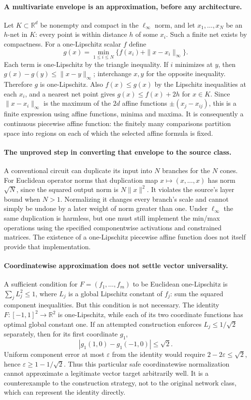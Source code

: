 \documentclass[11pt]{article}
\begin{document}
\paragraph{A multivariate envelope is an approximation, before any architecture.}
Let $K\subset\mathbb R^d$ be nonempty and compact in the $\ell_\infty$ norm, and let
$x_1,\ldots,x_N$ be an $h$-net in $K$: every point is within distance $h$ of
some $x_i$. Such a finite net exists by compactness.
For a one-Lipschitz scalar $f$ define
\[
 g(x)=\min_{1\leq i\leq N}\{f(x_i)+\|x-x_i\|_\infty\}.
\]
Each term is one-Lipschitz by the triangle inequality. If $i$ minimizes at $y$,
then $g(x)-g(y)\leq\|x-y\|_\infty$; interchange $x,y$ for the opposite
inequality. Therefore $g$ is one-Lipschitz. Also $f(x)\leq g(x)$ by the
Lipschitz inequalities at each $x_i$, and a nearest net point gives
$g(x)\leq f(x)+2h$ for $x\in K$.
Since $\|x-x_i\|_\infty$ is the maximum of the $2d$ affine functions
$\pm(x_j-x_{ij})$, this is a finite expression using affine functions, minima
and maxima. It is consequently a continuous piecewise affine function: the
finitely many comparisons partition space into regions on each of which the
selected affine formula is fixed.

\paragraph{The unproved step in converting that envelope to the source class.}
A conventional circuit can duplicate its input into $N$ branches for the $N$
cones. For Euclidean operator norms that duplication map
$x\mapsto(x,\ldots,x)$ has norm $\sqrt N$, since the squared output norm is
$N\|x\|^2$. It violates the source's layer bound when $N>1$.
Normalizing it changes every branch's scale and cannot simply be undone by a
later weight of norm greater than one. Under $\ell_\infty$ the same duplication
is harmless, but one must still implement the min/max operations using the
specified componentwise activations and constrained matrices. The existence of
a one-Lipschitz piecewise affine function does not itself provide that implementation.

\paragraph{Coordinatewise approximation does not settle vector universality.}
A sufficient condition for $F=(f_1,\ldots,f_m)$ to be Euclidean one-Lipschitz
is $\sum_j L_j^2\leq1$, where $L_j$ is a global Lipschitz constant of $f_j$:
sum the squared component inequalities. But this condition is not necessary.
The identity $F:[-1,1]^2\to\mathbb R^2$ is one-Lipschitz, while each of its
two coordinate functions has optimal global constant one.
If an attempted construction enforces $L_j\leq1/\sqrt2$ separately, then for
its first coordinate $g_1$,
\[
 |g_1(1,0)-g_1(-1,0)|\leq\sqrt2.
\]
Uniform component error at most $\varepsilon$ from the identity would require
$2-2\varepsilon\leq\sqrt2$, hence
$\varepsilon\geq1-1/\sqrt2$. Thus this particular safe coordinatewise
normalization cannot approximate a legitimate vector target arbitrarily well.
It is a counterexample to the construction strategy, not to the original network
class, which can represent the identity directly.
\end{document}
